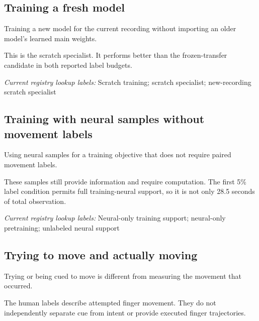 \begin{samepage}
\subsection*{Training a fresh model}
\noindent Training a new model for the current recording without importing an older model’s learned main weights.\par
\end{samepage}
\begin{samepage}
\noindent This is the scratch specialist. It performs better than the frozen-transfer candidate in both reported label budgets.\par\nopagebreak[4]

\end{samepage}


\noindent\textit{Current registry lookup labels:} Scratch training; scratch specialist; new-recording scratch specialist\par

\begin{samepage}
\subsection*{Training with neural samples without movement labels}
\noindent Using neural samples for a training objective that does not require paired movement labels.\par
\end{samepage}
\begin{samepage}
\noindent These samples still provide information and require computation. The first 5\% label condition permits full training-neural support, so it is not only 28.5 seconds of total observation.\par\nopagebreak[4]

\end{samepage}


\noindent\textit{Current registry lookup labels:} Neural-only training support; neural-only pretraining; unlabeled neural support\par

\begin{samepage}
\subsection*{Trying to move and actually moving}
\noindent Trying or being cued to move is different from measuring the movement that occurred.\par
\end{samepage}
\begin{samepage}
\noindent The human labels describe attempted finger movement. They do not independently separate cue from intent or provide executed finger trajectories.\par\nopagebreak[4]

\end{samepage}


